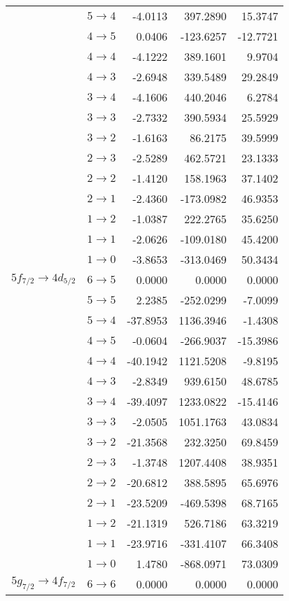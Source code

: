 \begin{table}[b]
\begin{tiny}
\begin{tabular}{cc|rrr}
 & $5 \rightarrow 4$ &-4.0113&397.2890&15.3747\\
 & $4 \rightarrow 5$ &0.0406&-123.6257&-12.7721\\
 & $4 \rightarrow 4$ &-4.1222&389.1601&9.9704\\
 & $4 \rightarrow 3$ &-2.6948&339.5489&29.2849\\
 & $3 \rightarrow 4$ &-4.1606&440.2046&6.2784\\
 & $3 \rightarrow 3$ &-2.7332&390.5934&25.5929\\
 & $3 \rightarrow 2$ &-1.6163&86.2175&39.5999\\
 & $2 \rightarrow 3$ &-2.5289&462.5721&23.1333\\
 & $2 \rightarrow 2$ &-1.4120&158.1963&37.1402\\
 & $2 \rightarrow 1$ &-2.4360&-173.0982&46.9353\\
 & $1 \rightarrow 2$ &-1.0387&222.2765&35.6250\\
 & $1 \rightarrow 1$ &-2.0626&-109.0180&45.4200\\
 & $1 \rightarrow 0$ &-3.8653&-313.0469&50.3434\\[4pt]
$5f_{7/2} \rightarrow 4d_{5/2}$ & $6 \rightarrow 5$ &0.0000&0.0000&0.0000\\
 & $5 \rightarrow 5$ &2.2385&-252.0299&-7.0099\\
 & $5 \rightarrow 4$ &-37.8953&1136.3946&-1.4308\\
 & $4 \rightarrow 5$ &-0.0604&-266.9037&-15.3986\\
 & $4 \rightarrow 4$ &-40.1942&1121.5208&-9.8195\\
 & $4 \rightarrow 3$ &-2.8349&939.6150&48.6785\\
 & $3 \rightarrow 4$ &-39.4097&1233.0822&-15.4146\\
 & $3 \rightarrow 3$ &-2.0505&1051.1763&43.0834\\
 & $3 \rightarrow 2$ &-21.3568&232.3250&69.8459\\
 & $2 \rightarrow 3$ &-1.3748&1207.4408&38.9351\\
 & $2 \rightarrow 2$ &-20.6812&388.5895&65.6976\\
 & $2 \rightarrow 1$ &-23.5209&-469.5398&68.7165\\
 & $1 \rightarrow 2$ &-21.1319&526.7186&63.3219\\
 & $1 \rightarrow 1$ &-23.9716&-331.4107&66.3408\\
 & $1 \rightarrow 0$ &1.4780&-868.0971&73.0309\\[4pt]
$5g_{7/2} \rightarrow 4f_{7/2}$ & $6 \rightarrow 6$ &0.0000&0.0000&0.0000\\

\end{tabular}
\end{tiny}
\end{table}
